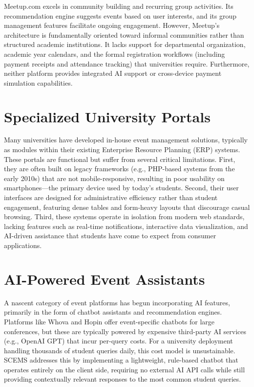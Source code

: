 \documentclass[12pt,a4paper]{report}
\begin{document}
Meetup.com excels in community building and recurring group activities. Its recommendation engine suggests events based on user interests, and its group management features facilitate ongoing engagement. However, Meetup's architecture is fundamentally oriented toward informal communities rather than structured academic institutions. It lacks support for departmental organization, academic year calendars, and the formal registration workflows (including payment receipts and attendance tracking) that universities require. Furthermore, neither platform provides integrated AI support or cross-device payment simulation capabilities.

\section{Specialized University Portals}

Many universities have developed in-house event management solutions, typically as modules within their existing Enterprise Resource Planning (ERP) systems. These portals are functional but suffer from several critical limitations. First, they are often built on legacy frameworks (e.g., PHP-based systems from the early 2010s) that are not mobile-responsive, resulting in poor usability on smartphones---the primary device used by today's students. Second, their user interfaces are designed for administrative efficiency rather than student engagement, featuring dense tables and form-heavy layouts that discourage casual browsing. Third, these systems operate in isolation from modern web standards, lacking features such as real-time notifications, interactive data visualization, and AI-driven assistance that students have come to expect from consumer applications.

\section{AI-Powered Event Assistants}

A nascent category of event platforms has begun incorporating AI features, primarily in the form of chatbot assistants and recommendation engines. Platforms like Whova and Hopin offer event-specific chatbots for large conferences, but these are typically powered by expensive third-party AI services (e.g., OpenAI GPT) that incur per-query costs. For a university deployment handling thousands of student queries daily, this cost model is unsustainable. SCEMS addresses this by implementing a lightweight, rule-based chatbot that operates entirely on the client side, requiring no external AI API calls while still providing contextually relevant responses to the most common student queries.
\end{document}
